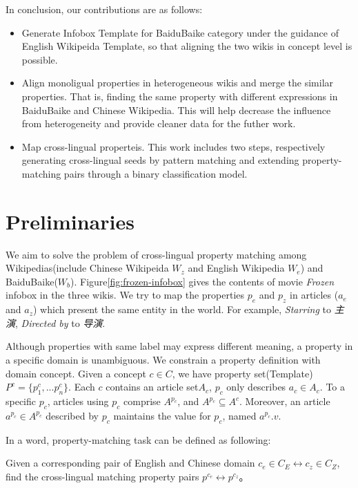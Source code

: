 \documentclass[runningheads,a4paper]{llncs}
\begin{document}
In conclusion, our contributions are as follows:
\begin{itemize}
\item Generate Infobox Template for BaiduBaike category under the guidance of English Wikipeida Template, so that aligning the two wikis in concept level is possible.
\item Align monoligual properties in heterogeneous wikis and merge the similar properties. That is, finding the same property with different expressions in BaiduBaike and Chinese Wikipedia. This will help decrease the influence from heterogeneity and provide cleaner data for the futher work.
\item Map cross-lingual properteis. This work includes two steps, respectively generating cross-lingual seeds by pattern matching and extending property-matching pairs through a binary classification model.
\end{itemize}

\section{Preliminaries}
We aim to solve the problem of cross-lingual property matching among Wikipedias(include Chinese Wikipeida $W_z$ and English Wikipedia $W_e$) and BaiduBaike($W_b$). Figure\ref{fig:frozen-infobox} gives the contents of movie \emph{Frozen} infobox in the three wikis. We try to map the properties $p_e$ and $p_z$ in articles ($a_e$ and $a_z$) which present the same entity in the world. For example, \emph{Starring} to \emph{主演}, \emph{Directed by} to \emph{导演}.

Although properties with same label may express different meaning, a property in a specific domain is unambiguous. We constrain a property definition with domain concept. Given a concept $c \in C$, we have property set(Template) $P^c=\{p^c_1,...p^c_n\}$. Each $c$ contains an article set$A_c$, $p_c$ only describes $a_c \in A_c$. To a specific $p_c$, articles using $p_c$ comprise $A^{p_c}$, and $A^{p_c} \subseteq A^c$. Moreover, an article $a^{p_c} \in A^{p_c}$ described by $p_c$ maintains the value for $p_c$, named $a^{p_c}.v$.

In a word, property-matching task can be defined as following:
\begin{definition}
Given a corresponding pair of English and Chinese domain $c_e \in C_E \leftrightarrow c_z \in C_Z$, find the cross-lingual matching property pairs $p^{c_e} \leftrightarrow p^{c_z}$。
\end{definition}
\end{document}
